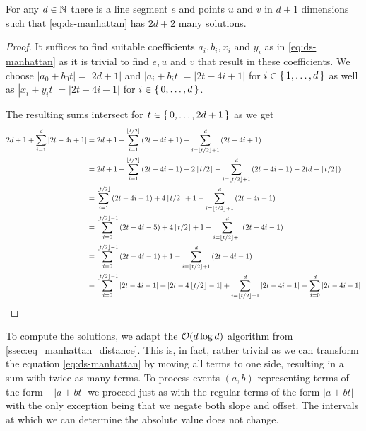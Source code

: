\begin{lemma}\label{lem:ds-manhattan}
	For any \(d \in \mathbb{N}\) there is a line segment \(e\) and points \(u\) and \(v\) in \(d+1\) dimensions such that \cref{eq:ds-manhattan} has \(2d + 2\) many solutions. 
\end{lemma}

\begin{proof}
	It suffices to find suitable coefficients \(a_i, b_i, x_i\) and \(y_i\) as in \cref{eq:ds-manhattan} as it is trivial to find \(e, u\) and \(v\) that result in these coefficients. We choose \(|a_0 + b_0 t| = |2d +1|\) and \(|a_i + b_i t| = |2t - 4i + 1|\) for \(i \in \set{1, \dots, d}\) as well as \(|x_i + y_i t| = |2t - 4i - 1|\) for \(i \in \set{0, \dots, d}\).

	The resulting sums intersect for \(t \in \set{0, \dots, 2d+1}\) as we get 
	\begin{align*}
		2d+1 + \sum_{i=1}^d \left|2t - 4i + 1\right| &= 2d+1 + \sum_{i=1}^{\left\lfloor t/2\right\rfloor} \left(2t - 4i + 1\right)  - \sum_{i=\left\lfloor t/2\right\rfloor+1}^d \left(2t - 4i + 1\right) \\
		 &= 2d+1 + \sum_{i=1}^{\left\lfloor t/2\right\rfloor} \left(2t - 4i - 1\right) + 2\left\lfloor t/2\right\rfloor - \sum_{i=\left\lfloor t/2\right\rfloor+1}^d \left(2t - 4i - 1\right)  - 2(d-\left\lfloor t/2\right\rfloor)\\
		 &= \sum_{i=1}^{\left\lfloor t/2\right\rfloor} \left(2t - 4i - 1\right) + 4\left\lfloor t/2\right\rfloor + 1 - \sum_{i=\left\lfloor t/2\right\rfloor+1}^d \left(2t - 4i - 1\right) \\
		 &= \sum_{i=0}^{\left\lfloor t/2\right\rfloor-1} \left(2t - 4i - 5\right) + 4\left\lfloor t/2\right\rfloor + 1 - \sum_{i=\left\lfloor t/2\right\rfloor+1}^d \left(2t - 4i - 1\right) \\
		 &= \sum_{i=0}^{\left\lfloor t/2\right\rfloor-1} \left(2t - 4i - 1\right) + 1 - \sum_{i=\left\lfloor t/2\right\rfloor+1}^d \left(2t - 4i - 1\right) \\
		 &= \sum_{i=0}^{\left\lfloor t/2\right\rfloor-1} \left|2t - 4i - 1\right| + \left|2t - 4\left\lfloor t/2\right\rfloor-1\right|+ \sum_{i=\left\lfloor t/2\right\rfloor+1}^d \left|2t - 4i - 1\right| = \sum_{i=0}^d \left|2t - 4i - 1\right|
	\end{align*}
\end{proof}


To compute the solutions, we adapt the \(\mathcal{O}(d\log d)\) algorithm from \cref{ssec:eq_manhattan_distance}. This is, in fact, rather trivial as we can transform the equation \cref{eq:ds-manhattan} by moving all terms to one side, resulting in a sum with twice as many terms. To process events \((a, b)\) representing terms of the form \(-|a + bt|\) we proceed just as with the regular terms of the form \(|a+bt|\) with the only exception being that we negate both slope and offset. The intervals at which we can determine the absolute value does not change.

